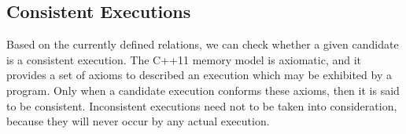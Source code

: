 \documentclass[preprint, numbers, 10pt]{sigplanconf}
\begin{document}
%
%
%


\subsection{Consistent Executions}
\label{sec:consistentExe}

Based on the currently defined relations, we can check whether a given 
candidate is a consistent execution. 
The C++11 memory model is axiomatic, and it provides a set of axioms 
to described an execution which may be exhibited by a program.
Only when a candidate execution conforms these axioms, then it is 
said to be consistent. Inconsistent executions need not to be taken into 
consideration, because they will never occur by any actual execution. 
\end{document}
